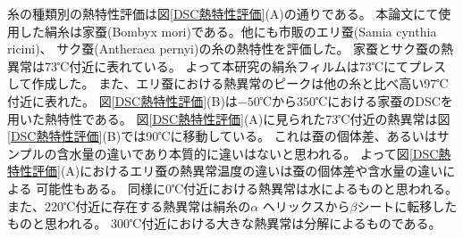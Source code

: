 \documentclass[dvipdfmx,12pt,a4paper]{jreport}
\begin{document}
	糸の種類別の熱特性評価は図\ref{DSC熱特性評価}(A)の通りである。
	本論文にて使用した絹糸は家蚕(Bombyx mori)である。他にも市販のエリ蚕(Samia cynthia ricini)、
	サク蚕(Antheraea pernyi)の糸の熱特性を評価した。
	家蚕とサク蚕の熱異常は73℃付近に表れている。
	よって本研究の絹糸フィルムは73℃にてプレスして作成した。
	また、エリ蚕における熱異常のピークは他の糸と比べ高い97℃付近に表れた。
	図\ref{DSC熱特性評価}(B)は$-50$℃から$350$℃における家蚕のDSCを用いた熱特性である。
	図\ref{DSC熱特性評価}(A)に見られた73℃付近の熱異常は図\ref{DSC熱特性評価}(B)では90℃に移動している。
	これは蚕の個体差、あるいはサンプルの含水量の違いであり本質的に違いはないと思われる。
	よって図\ref{DSC熱特性評価}(A)におけるエリ蚕の熱異常温度の違いは蚕の個体差や含水量の違いによる
	可能性もある。
	同様に0℃付近における熱異常は水によるものと思われる。
	また、220℃付近に存在する熱異常は絹糸の$\alpha$ ヘリックスから$\beta$シートに転移したものと思われる。
	300℃付近における大きな熱異常は分解によるものである。
	
\end{document}
